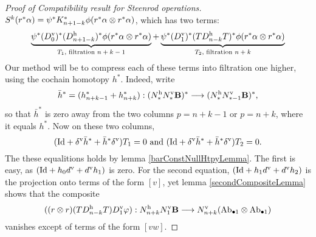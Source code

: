 \documentclass[10pt]{article}
\begin{document}
\begin{Lie Steenrods satisfy the Adem relation}
\begin{proof}[Proof of Compatibility result for Steenrod operations]
 $S^k(r^*\alpha)=\psi^*K^*_{n+1-k}\oldphi(r^*\alpha\otimes r^*\alpha)$, which has two terms:
\[\underbrace{\psi^*(D^\textup{v}_0)^*(D^\textup{h}_{n+1-k})^*\oldphi(r^*\alpha\otimes r^*\alpha)}_{\textup{$T_1$, filtration $n+k-1$}}+
\underbrace{\psi^*(D^\textup{v}_1)^*(TD^\textup{h}_{n-k}T)^*
\oldphi(r^*\alpha\otimes r^*\alpha)}_{\textup{$T_2$, filtration $n+k$}}\]
Our method will be to compress each of these terms into filtration one higher, using the cochain homotopy $h^*$. Indeed, write 
\[\bar{h}^*=(h^*_{n+k-1}+h^*_{n+k}):(N^\textup{h}_*N^\textup{v}_*\textbf{B})^*\to (N^\textup{h}_*N^\textup{v}_{*-1}\textbf{B})^*,\]
so that $\bar{h}^*$ is zero away from the two columns $p=n+k-1$ or $p=n+k$, where it equals $h^*$. Now on these two columns,
\[(\textup{Id}+\delta^\textup{v}\bar{h}^*+ \bar{h}^*\delta^\textup{v})T_1=0\textup{ and }(\textup{Id}+\delta^\textup{v}\bar{h}^*+ \bar{h}^*\delta^\textup{v})T_2=0.\]
The these equalitions holds by lemma \ref{barConstNullHtpyLemma}. The first is easy, as $(\textup{Id}+h_{0}d^\textup{v}+d^\textup{v}h_{1})$ is zero. For the second equation, $(\textup{Id}+h_{1}d^\textup{v}+d^\textup{v}h_{2})$ is the projection onto terms of the form $[v]$, yet lemma \ref{secondCompositeLemma} shows that the composite
\[((r\otimes r)\circ(TD^\textup{h}_{n-k}T)\circ D^\textup{v}_1\circ\phi): N^\textup{h}_{n+k}N^\textup{v}_1\textbf{B}\to N^\textup{v}_{n+k}(\textup{Ab}_{\bullet1}\otimes \textup{Ab}_{\bullet1})\]
vanishes except of terms of the form $[vw]$.







\end{proof}
\end{Lie Steenrods satisfy the Adem relation}
\end{document}

